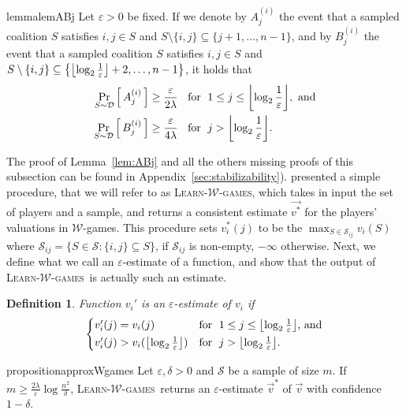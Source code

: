 \documentclass[letterpaper]{article} %
\newtheorem{definition}[theorem]{Definition}
\DeclarePairedDelimiter{\floor}{\lfloor}{\rfloor}
\let\eps\varepsilon
\newcommand{\distribution}{\mathcal{D}}
\newcommand{\set}[1]{\{#1\}}
\newcommand{\Prob}[2]{\Pr_{#2}\left[\,#1\,\right]}
\newcommand{\Wthreshold}{\ensuremath{\floor*{\log_2{\frac{1}{\varepsilon}}}}}
\newcommand{\W}{\ensuremath{\mathcal{W}}}
\newcommand{\sample}{\ensuremath{\mathcal{S}}}
\newcommand{\learnWGames}{\textsc{Learn-}\W\textsc{-games}}
\begin{document}
\begin{restatable}{lemma}{lemABj}\label{lem:ABj}
Let $\eps>0$ be fixed. If we denote by $A^{(i)}_j$ the event that a sampled coalition $S$ satisfies $i,j \in S$ and $S\setminus \{i, j\} \subseteq \{j+1, \ldots, n-1\}$, and by $B^{(i)}_j$ the event that a sampled coalition $S$ satisfies $i,j \in S$ and $S\setminus \{i,j\} \subseteq \left\{\Wthreshold+2, \ldots, n-1\right\}$, it holds that
\begin{align*}
 \Prob{A^{(i)}_j}{S\sim \distribution} \geq \frac{\eps}{2 \lambda} &\; \text{\; for \;} 1 \leq j \leq \Wthreshold, \text{ and}\\
 \Prob{B^{(i)}_j}{S\sim \distribution} \geq \frac{\eps}{4 \lambda} &\; \text{\; for \;} j > \Wthreshold.
\end{align*}
\end{restatable}
The proof of Lemma~\ref{lem:ABj} and all the others missing proofs of this subsection can be found in Appendix~\ref{sec:stabilizability}).
\citet{SliwinskiZ17} presented a simple procedure, that we will refer to as \learnWGames, which takes in input the set of players and a sample, and returns a consistent estimate $\vec{v^*}$ for the players' valuations in $\W$-games. This procedure sets $v^*_{i}(j)$ to be the $\max_{S \in \mathcal{S}_{ij}} v_i(S)$ where $\mathcal{S}_{ij} = \set{S\in \mathcal{S}: \set{i,j} \subseteq S}$, if $\mathcal{S}_{ij}$ is non-empty, $-\infty$ otherwise.
Next, we define what we call an $\eps$-estimate of a function, and show that the output of \learnWGames\ is actually such an estimate.

\begin{definition}
Function $v_i'$ is an $\eps$-\emph{estimate} of $v_i$ if
\begin{equation}
\begin{cases*}
v_i'(j) = v_i(j) & for \;$1 \leq j \leq \Wthreshold$, and\\
v_i'(j) > v_i(\Wthreshold) & for \;$j > \Wthreshold$.\\
\end{cases*}
\end{equation}
\end{definition}

\begin{restatable}{proposition}{approxWgames}\label{prop:approx_wgames}
Let $\eps, \delta >0$ and $\sample$ be a sample of size $m$. If $m\geq \frac{2\lambda}{\eps}\log{\frac{n^2}{\delta}}$, \learnWGames\ returns an $\eps$-estimate $\vec{v}^*$ of $\vec{v}$ with confidence $1-\delta$.
\end{restatable}
\end{document}
